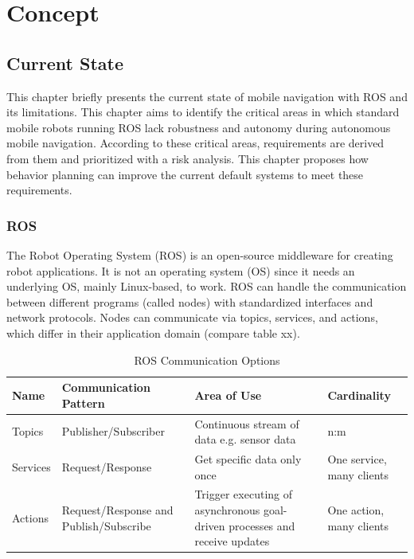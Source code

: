 \chapter{Concept}
\label{cha:methoden}


\section{Current State}
This chapter briefly presents the current state of mobile navigation with ROS and its limitations. 
This chapter aims to identify the critical areas in which standard mobile robots running ROS lack robustness and autonomy during autonomous mobile navigation. According to these critical areas, requirements are derived from them and prioritized with a risk analysis. 
This chapter proposes how behavior planning can improve the current default systems to meet these requirements. 

\subsection{ROS}
The Robot Operating System (ROS) is an open-source middleware for creating robot applications. It is not an operating system (OS) since it needs an underlying OS, mainly Linux-based, to work. 
ROS can handle the communication between different programs (called nodes) with standardized interfaces and network protocols. Nodes can communicate via topics, services, and actions, which differ in their application domain (compare table xx). 

\begin{table}[h!]
	\caption{ROS Communication Options}
	\begin{tabular}{ | m{} | m{}| m{} | m{}|} 
  	\hline
  	Name & Communication Pattern & Area of Use & Cardinality \\ 
  	\hline
  	Topics & Publisher/Subscriber & Continuous stream of data e.g. sensor data &  n:m \\ 
  	\hline
  	Services & Request/Response & Get specific data only once & One service, many clients \\ 
  	\hline
  	Actions & Request/Response and Publish/Subscribe & Trigger executing of asynchronous goal-driven processes and receive updates & One action, many clients \\
  	\hline
	\end{tabular}
\end{table}

